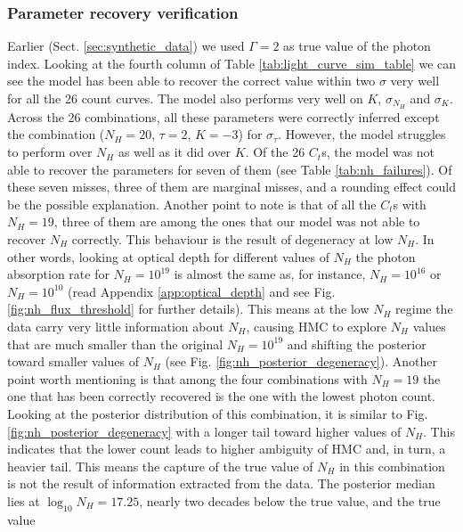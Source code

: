 \documentclass{aa}
\begin{document}
\subsubsection{Parameter recovery verification}
\label{sec:verification_results_parameter}
Earlier (Sect. \ref{sec:synthetic_data}) we used $\Gamma = 2$ as true value of the photon index. Looking at the fourth column of Table \ref{tab:light_curve_sim_table} we can see the model has been able to recover the correct value within two $\sigma$ very well for all the 26 count curves. The model also performs very well on $K$, $\sigma_{N_H}$ and $\sigma_K$. Across the 26 combinations, all these parameters were correctly inferred except the combination ($N_H = 20$, $\tau = 2$, $K = -3$) for $\sigma_{\tau}$. However, the model struggles to perform over $N_H$ as well as it did over $K$. Of the 26 $C_t$s, the model was not able to recover the parameters for seven of them (see Table \ref{tab:nh_failures}). Of these seven misses, three of them are marginal misses, and a rounding effect could be the possible explanation. Another point to note is that of all the $C_t$s with $N_H = 19$, three of them are among the ones that our model was not able to recover $N_H$ correctly. This behaviour is the result of degeneracy at low $N_H$. In other words, looking at optical depth for different values of $N_H$ the photon absorption rate for $N_H = 10^{19}$ is almost the same as, for instance, $N_H = 10^{16}$ or $N_H = 10^{10}$ (read Appendix \ref{app:optical_depth} and see Fig. \ref{fig:nh_flux_threshold} for further details). This means at the low $N_H$ regime the data carry very little information about $N_H$, causing HMC to explore $N_H$ values that are much smaller than the original $N_H = 10^{19}$ and shifting the posterior toward smaller values of $N_H$ (see Fig. \ref{fig:nh_posterior_degeneracy}). Another point worth mentioning is that among the four combinations with $N_H = 19$ the one that has been correctly recovered is the one with the lowest photon count. Looking at the posterior distribution of this combination, it is similar to Fig. \ref{fig:nh_posterior_degeneracy} with a longer tail toward higher values of $N_H$. This indicates that the lower count leads to higher ambiguity of HMC and, in turn, a heavier tail. This means the capture of the true value of $N_H$ in this combination is not the result
of information extracted from the data. The posterior median lies at
$\log_{10} N_H = 17.25$, nearly two decades below the true value, and the true value
\end{document}
